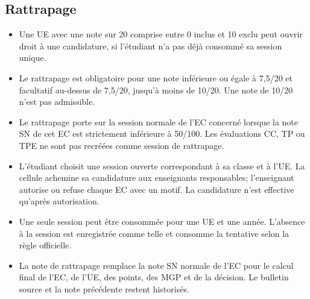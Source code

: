 \documentclass[11pt,a4paper]{article}
\begin{document}
\subsection{Rattrapage}
\begin{itemize}
  \item Une UE avec une note sur 20 comprise entre 0 inclus et 10 exclu peut ouvrir droit à une candidature, si l’étudiant n’a pas déjà consommé sa session unique.
  \item Le rattrapage est obligatoire pour une note inférieure ou égale à 7,5/20 et facultatif au-dessus de 7,5/20, jusqu’à moins de 10/20. Une note de 10/20 n’est pas admissible.
  \item Le rattrapage porte sur la session normale de l'EC concerné lorsque la note SN de cet EC est strictement inférieure à 50/100. Les évaluations CC, TP ou TPE ne sont pas recréées comme session de rattrapage.
  \item L'étudiant choisit une session ouverte correspondant à sa classe et à l'UE. La cellule achemine sa candidature aux enseignants responsables; l'enseignant autorise ou refuse chaque EC avec un motif. La candidature n'est effective qu'après autorisation.
  \item Une seule session peut être consommée pour une UE et une année. L'absence à la session est enregistrée comme telle et consomme la tentative selon la règle officielle.
  \item La note de rattrapage remplace la note SN normale de l'EC pour le calcul final de l'EC, de l'UE, des points, des MGP et de la décision. Le bulletin source et la note précédente restent historisés.
\end{itemize}
\end{document}

